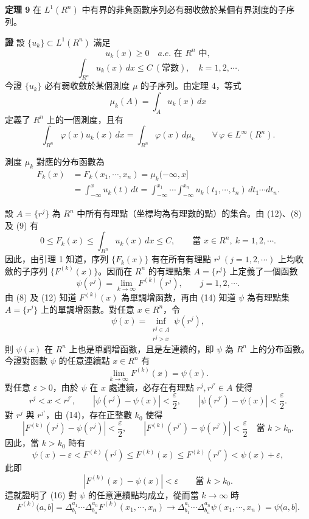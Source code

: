 \documentclass[11pt,a4paper,twoside]{article}
\begin{document}
\noindent\textbf{定理 9}\quad
在 $L^1(R^n)$ 中有界的非負函數序列必有弱收斂於某個有界測度的子序列。

\noindent\textbf{證}\quad
設 $\{u_k\}\subset L^1(R^n)$ 滿足
\[
    u_k(x)\ge0\quad a.e.\text{ 在 }R^n\text{ 中},
    \tag{8}
\]
\[
    \int_{R^n}u_k(x)\,dx\le C\ (\text{常數}),\quad k=1,2,\cdots .
    \tag{9}
\]
今證 $\{u_k\}$ 必有弱收斂於某個測度 $\mu$ 的子序列。由定理 4，等式
\[
    \mu_k(A)=\int_Au_k(x)\,dx
    \tag{10}
\]
定義了 $R^n$ 上的一個測度，且有
\[
    \int_{R^n}\varphi(x)u_k(x)\,dx
    =
    \int_{R^n}\varphi(x)\,d\mu_k
    \qquad
    \forall\,\varphi\in L^\infty(R^n).
    \tag{11}
\]

測度 $\mu_k$ 對應的分布函數為
\[
    \begin{aligned}
        F_k(x)
         & =F_k(x_1,\cdots,x_n)
        =\mu_k(-\infty,x]                \\
         & =\int_{-\infty}^{x}u_k(t)\,dt
        =\int_{-\infty}^{x_1}\cdots\int_{-\infty}^{x_n}
        u_k(t_1,\cdots,t_n)\,dt_1\cdots dt_n .
    \end{aligned}
    \tag{12}
\]

\newpage

設 $A=\{r^j\}$ 為 $R^n$ 中所有有理點（坐標均為有理數的點）的集合。由
(12)、(8) 及 (9) 有
\[
    0\le F_k(x)\le\int_{R^n}u_k(x)\,dx\le C,
    \qquad
    \text{當 }x\in R^n,\ k=1,2,\cdots .
    \tag{13}
\]
因此，由引理 1 知道，序列 $\{F_k(x)\}$ 有在所有有理點
$r^j\ (j=1,2,\cdots)$ 上均收斂的子序列 $\{F^{(k)}(x)\}$。因而在
$R^n$ 的有理點集 $A=\{r^j\}$ 上定義了一個函數
\[
    \psi(r^j)=\lim_{k\to\infty}F^{(k)}(r^j),
    \qquad j=1,2,\cdots .
    \tag{14}
\]
由 (8) 及 (12) 知道 $F^{(k)}(x)$ 為單調增函數，再由 (14) 知道
$\psi$ 為有理點集 $A=\{r^j\}$ 上的單調增函數。對任意 $x\in R^n$，令
\[
    \psi(x)=\inf_{\substack{r^j\in A\\ r^j>x}}\psi(r^j),
    \tag{15}
\]
則 $\psi(x)$ 在 $R^n$ 上也是單調增函數，且是左連續的，即 $\psi$ 為
$R^n$ 上的分布函數。今證對函數 $\psi$ 的任意連續點 $x\in R^n$ 有
\[
    \lim_{k\to\infty}F^{(k)}(x)=\psi(x).
    \tag{16}
\]
對任意 $\varepsilon>0$，由於 $\psi$ 在 $x$ 處連續，必存在有理點
$r^j,r^{j'}\in A$ 使得
\[
    r^j<x<r^{j'},
    \qquad
    |\psi(r^j)-\psi(x)|<\frac{\varepsilon}{2},
    \qquad
    |\psi(r^{j'})-\psi(x)|<\frac{\varepsilon}{2}.
\]
對 $r^j$ 與 $r^{j'}$，由 (14)，存在正整數 $k_0$ 使得
\[
    |F^{(k)}(r^j)-\psi(r^j)|<\frac{\varepsilon}{2},
    \qquad
    |F^{(k)}(r^{j'})-\psi(r^{j'})|<\frac{\varepsilon}{2}
    \quad\text{當 }k>k_0.
\]
因此，當 $k>k_0$ 時有
\[
    \psi(x)-\varepsilon
    <
    F^{(k)}(r^j)
    \le
    F^{(k)}(x)
    \le
    F^{(k)}(r^{j'})
    <
    \psi(x)+\varepsilon,
\]
此即
\[
    |F^{(k)}(x)-\psi(x)|<\varepsilon
    \qquad \text{當 }k>k_0.
\]
這就證明了 (16) 對 $\psi$ 的任意連續點均成立，從而當 $k\to\infty$ 時
\[
    F^{(k)}(a,b]
    =
    \Delta_{b_1}^{a_1}\cdots\Delta_{b_n}^{a_n}
    F^{(k)}(x_1,\cdots,x_n)
    \longrightarrow
    \Delta_{b_1}^{a_1}\cdots\Delta_{b_n}^{a_n}
    \psi(x_1,\cdots,x_n)
    =
    \psi(a,b].
    \tag{17}
\]
\end{document}
